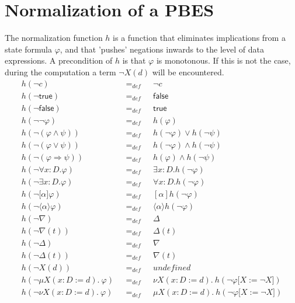 \documentclass{article}
\begin{document}
\newpage

\section{Normalization of a PBES}

The normalization function $h$ is a function that eliminates implications
from a state formula $\varphi $, and that 'pushes' negations inwards to the
level of data expressions. A precondition of $h$ is that $\varphi $ is
monotonous. If this is not the case, during the computation a term $\lnot
X(d)$ will be encountered.%
\begin{equation*}
\begin{array}{lll}
h(\lnot c) & =_{def} & \lnot c \\
h(\lnot \mathsf{true}) & =_{def} & \mathsf{false} \\
h(\lnot \mathsf{false}) & =_{def} & \mathsf{true} \\
h(\lnot \lnot \varphi ) & =_{def} & h(\varphi ) \\
h(\lnot (\varphi \wedge \psi )) & =_{def} & h(\lnot \varphi )\vee h(\lnot
\psi ) \\
h(\lnot (\varphi \vee \psi )) & =_{def} & h(\lnot \varphi )\wedge h(\lnot
\psi ) \\
h(\lnot (\varphi \Rightarrow \psi )) & =_{def} & h(\varphi )\wedge h(\lnot
\psi ) \\
h(\lnot \forall {x{:}D}.\varphi ) & =_{def} & \exists {x{:}D}.h(\lnot
\varphi ) \\
h(\lnot \exists {x{:}D}.\varphi ) & =_{def} & \forall {x{:}D}.h(\lnot
\varphi ) \\
h(\lnot \lbrack \alpha ]\varphi ) & =_{def} & [\alpha ]h(\lnot \varphi ) \\
h(\lnot \langle \alpha \rangle \varphi ) & =_{def} & \langle \alpha \rangle
h(\lnot \varphi ) \\
h(\lnot \nabla ) & =_{def} & \Delta  \\
h(\lnot \nabla (t)) & =_{def} & \Delta (t) \\
h(\lnot \Delta ) & =_{def} & \nabla  \\
h(\lnot \Delta (t)) & =_{def} & \nabla (t) \\
h(\lnot X(d)) & =_{def} & undefined \\
h(\lnot \mu X(x{:}D:=d).~\varphi )~~~ & =_{def}~~~ & \nu X(x{:}%
D:=d).~h(\lnot \varphi \lbrack X:=\lnot X]) \\
h(\lnot \nu X(x{:}D:=d).~\varphi )~~~ & =_{def}~~~ & \mu X(x{:}%
D:=d).~h(\lnot \varphi \lbrack X:=\lnot X]) \\

\end{array}
\end{equation*}
\end{document}
